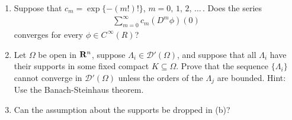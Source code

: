 \renewcommand{\labelenumi}{(\alph{enumi})} 
{\CMUCS
\begin{enumerate}
\item Suppose that $c_m=\exp\{\minus (m!)!\}$, $m=0,\, 1,\, 2,\, \dots\, $. Does the series
\begin{align*}{
\sum_{m=0}^\infty c_m (D^m\phi)(0)
}\end{align*}
converges for every $\phi\in C^{\,\infty} (R)$?
\item Let $\Omega$ be open in ${\mathbf R}^n$, suppose $\Lambda_i\in \mathscr{D}'(\Omega)$, and suppose that all $\Lambda_i$ have their supports in some fixed compact $K\subseteq \Omega$. Prove that the sequence $\{\Lambda_i\}$ cannot converge in $\mathscr{D}'(\Omega)$ unless the orders of the $\Lambda_j$ are bounded. Hint: Use the Banach-Steinhaus theorem.
\item Can the assumption about the supports be dropped in (b)?
\end{enumerate}}
